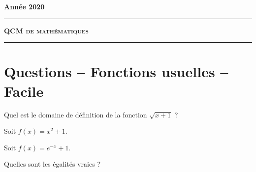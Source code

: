 \documentclass[12pt,a4paper]{article}
\begin{document}
 
 


\hfill\textbf{Ann\'ee 2020}

\vspace*{0.5ex}
\hrule\vspace*{1.5ex} 
\hfil\textsc{\textbf{\Large QCM de mathématiques}}
\vspace*{1ex} \hrule 
\vspace*{5ex} 

\section{Questions -- Fonctions usuelles -- Facile}




\begin{question}
Quel est le domaine de définition de la fonction $\sqrt{x+1}$ ?
\begin{answers} 
    \bad{$]1,+\infty[$}
    \good{$[-1,+\infty[$}
    \bad{$]-1,+\infty[$}
\end{answers}
\end{question}



\begin{question}
Soit $f(x) = x^2+1$.
\begin{answers} 
    \bad{Le domaine de définition de $f$ est $[1,+\infty[$}
\end{answers}
\end{question}


\begin{question}
Soit $f(x) = e^{-x}+1$.
\begin{answers} 
\end{answers}
\end{question}


\begin{question}
Quelles sont les égalités vraies ?
\begin{answers} 
\end{answers}
\end{question}
\end{document}
